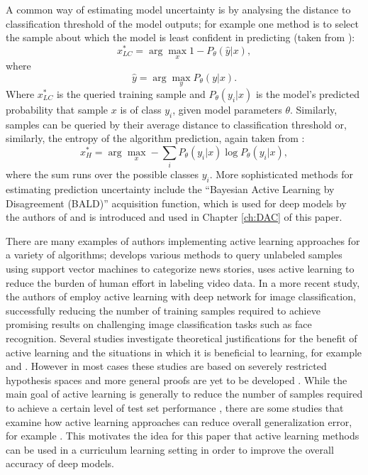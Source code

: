 A common way of estimating model uncertainty is by analysing the distance to classification threshold of the model outputs; for example one method is to select the sample about which the model is least confident in predicting (taken from \cite{settles2012active}):
\begin{equation}
x^{*}_{LC} = \arg\max_{x} 1 - P_{\theta}(\hat{y}|x),
\end{equation}
where
\begin{equation}
\hat{y} = \arg\max_{y}P_{\theta}(y|x).
\end{equation}
Where $x^{*}_{LC}$ is the queried training sample and $P_{\theta}(y_{i}|x)$ is the model's predicted probability that sample $x$ is of class $y_{i}$, given model parameters $\theta$. Similarly, samples can be queried by their average distance to classification threshold or, similarly, the entropy of the algorithm prediction, again taken from \cite{settles2012active}:
\begin{equation}
x^{*}_{H} = \arg\max_{x} - \sum_{i} P_{\theta}(y_i|x)\log P_{\theta}(y_i|x),
\end{equation}
where the sum runs over the possible classes $y_i$. More sophisticated methods for estimating prediction uncertainty include the ``Bayesian Active Learning by Disagreement (BALD)'' \cite{houlsby2011bayesian} acquisition function, which is used for deep models by the authors of \cite{gal2017deep} and is introduced and used in Chapter \ref{ch:DAC} of this paper.

There are many examples of authors implementing active learning approaches for a variety of algorithms; \cite{tong2001support} develops various methods to query unlabeled samples using support vector machines to categorize news stories, \cite{yang2003automatically} uses active learning to reduce the burden of human effort in labeling video data. In a more recent study, the authors of \cite{wang2017cost} employ active learning with deep network for image classification, successfully reducing the number of training samples required to achieve promising results on challenging image classification tasks such as face recognition. Several  studies investigate theoretical justifications for the benefit of active learning and the situations in which it is beneficial to learning, for example \cite{balcan2006agnostic} and \cite{balcan2010true}. However in most cases these studies are based on severely restricted hypothesis spaces and more general proofs are yet to be developed \cite{settles2012active}. While the main goal of active learning is generally to reduce the number of samples required to achieve a certain level of test set performance \cite{settles2012active}, there are some studies that examine how active learning approaches can reduce overall generalization error, for example \cite{cohn1994improving}. This motivates the idea for this paper that active learning methods can be used in a curriculum learning setting in order to improve the overall accuracy of deep models. 

